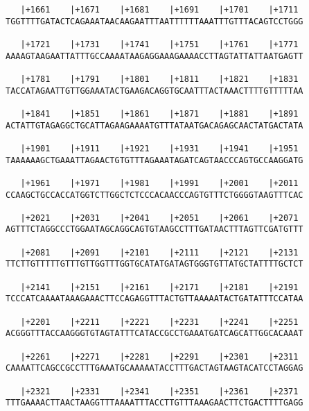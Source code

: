 \documentclass{article}
\begin{document}
\begin{Verbatim}
   |+1661    |+1671    |+1681    |+1691    |+1701    |+1711 
TGGTTTTGATACTCAGAAATAACAAGAATTTAATTTTTTAAATTTGTTTACAGTCCTGGG
                                                            
   |+1721    |+1731    |+1741    |+1751    |+1761    |+1771 
AAAAGTAAGAATTATTTGCCAAAATAAGAGGAAAGAAAACCTTAGTATTATTAATGAGTT
                                                            
   |+1781    |+1791    |+1801    |+1811    |+1821    |+1831 
TACCATAGAATTGTTGGAAATACTGAAGACAGGTGCAATTTACTAAACTTTTGTTTTTAA
                                                            
   |+1841    |+1851    |+1861    |+1871    |+1881    |+1891 
ACTATTGTAGAGGCTGCATTAGAAGAAAATGTTTATAATGACAGAGCAACTATGACTATA
                                                            
   |+1901    |+1911    |+1921    |+1931    |+1941    |+1951 
TAAAAAAGCTGAAATTAGAACTGTGTTTAGAAATAGATCAGTAACCCAGTGCCAAGGATG
                                                            
   |+1961    |+1971    |+1981    |+1991    |+2001    |+2011 
CCAAGCTGCCACCATGGTCTTGGCTCTCCCACAACCCAGTGTTTCTGGGGTAAGTTTCAC
                                                            
   |+2021    |+2031    |+2041    |+2051    |+2061    |+2071 
AGTTTCTAGGCCCTGGAATAGCAGGCAGTGTAAGCCTTTGATAACTTTAGTTCGATGTTT
                                                            
   |+2081    |+2091    |+2101    |+2111    |+2121    |+2131 
TTCTTGTTTTTGTTTGTTGGTTTGGTGCATATGATAGTGGGTGTTATGCTATTTTGCTCT
                                                            
   |+2141    |+2151    |+2161    |+2171    |+2181    |+2191 
TCCCATCAAAATAAAGAAACTTCCAGAGGTTTACTGTTAAAAATACTGATATTTCCATAA
                                                            
   |+2201    |+2211    |+2221    |+2231    |+2241    |+2251 
ACGGGTTTACCAAGGGTGTAGTATTTCATACCGCCTGAAATGATCAGCATTGGCACAAAT
                                                            
   |+2261    |+2271    |+2281    |+2291    |+2301    |+2311 
CAAAATTCAGCCGCCTTTGAAATGCAAAAATACCTTTGACTAGTAAGTACATCCTAGGAG
                                                            
   |+2321    |+2331    |+2341    |+2351    |+2361    |+2371 
TTTGAAAACTTAACTAAGGTTTAAAATTTACCTTGTTTAAAGAACTTCTGACTTTTGAGG
                                                            

\end{Verbatim}
\end{document}
